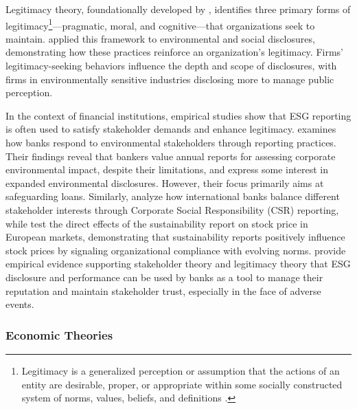 \documentclass[
  authoryear]{elsarticle}
\begin{document}
Legitimacy theory, foundationally developed by \citet{SUCHMAN1995},
identifies three primary forms of legitimacy\footnote{Legitimacy is a
  generalized perception or assumption that the actions of an entity are
  desirable, proper, or appropriate within some socially constructed
  system of norms, values, beliefs, and definitions
  \citep{GINZEL2004, NEILSEN1987, PERROW1970}.}---pragmatic, moral, and
cognitive---that organizations seek to maintain. \citet{DEEGAN2002}
applied this framework to environmental and social disclosures,
demonstrating how these practices reinforce an organization's
legitimacy. Firms' legitimacy-seeking behaviors influence the depth and
scope of disclosures, with firms in environmentally sensitive industries
disclosing more to manage public perception.

In the context of financial institutions, empirical studies show that
ESG reporting is often used to satisfy stakeholder demands and enhance
legitimacy. \citet{THOMPSON2004} examines how banks respond to
environmental stakeholders through reporting practices. Their findings
reveal that bankers value annual reports for assessing corporate
environmental impact, despite their limitations, and express some
interest in expanded environmental disclosures. However, their focus
primarily aims at safeguarding loans. Similarly, \citet{SCHOLTENS2009}
analyze how international banks balance different stakeholder interests
through Corporate Social Responsibility (CSR) reporting, while
\citet{CARNEVALE2014} test the direct effects of the sustainability
report on stock price in European markets, demonstrating that
sustainability reports positively influence stock prices by signaling
organizational compliance with evolving norms. \citet{MURE2021} provide
empirical evidence supporting stakeholder theory and legitimacy theory
that ESG disclosure and performance can be used by banks as a tool to
manage their reputation and maintain stakeholder trust, especially in
the face of adverse events.

\subsubsection{Economic Theories}\label{economic-theories}
\end{document}
